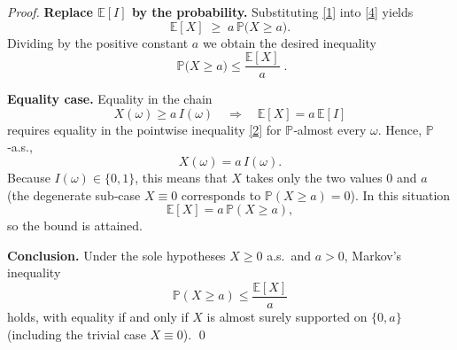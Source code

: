 \begin{proof}
\medskip
\textbf{Replace $\mathbb{E}[I]$ by the probability.}
Substituting \eqref{1} into \eqref{4} yields
\[
\mathbb{E}[X]\;\ge\;a\,\mathbb{P}\bigl(X\ge a\bigr).
\]
Dividing by the positive constant $a$ we obtain the desired inequality
\[
\boxed{\;\mathbb{P}\bigl(X\ge a\bigr)\le\frac{\mathbb{E}[X]}{a}\;}.
\]

\medskip
\textbf{Equality case.}
Equality in the chain
\[
X(\omega)\ge a\,I(\omega)\quad\Longrightarrow\quad\mathbb{E}[X]=a\,\mathbb{E}[I]
\]
requires equality in the pointwise inequality \eqref{2} for $\mathbb{P}$‑almost every $\omega$.
Hence, $\mathbb{P}$‑a.s.,
\[
X(\omega)=a\,I(\omega).
\]
Because $I(\omega)\in\{0,1\}$, this means that $X$ takes only the two values $0$ and $a$ (the degenerate sub‑case $X\equiv0$ corresponds to $\mathbb{P}(X\ge a)=0$). In this situation
\[
\mathbb{E}[X]=a\,\mathbb{P}(X\ge a),
\]
so the bound is attained.

\medskip
\textbf{Conclusion.}
Under the sole hypotheses $X\ge 0$ a.s.\ and $a>0$, Markov’s inequality
\[
\mathbb{P}(X\ge a)\le\frac{\mathbb{E}[X]}{a}
\]
holds, with equality if and only if $X$ is almost surely supported on $\{0,a\}$ (including the trivial case $X\equiv0$). \qed
\end{proof}